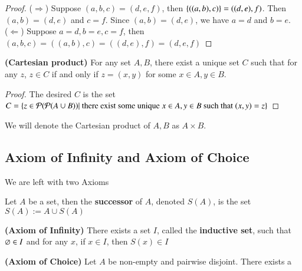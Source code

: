 \begin{proof}
    ($\Rightarrow$) Suppose $(a,b,c) = (d,e,f)$, then $\{((a,b),c)\} = ((d,e),f)$. Then $(a,b) = (d,e)$ and $c=f$. Since $(a,b) = (d,e)$, we have $a = d$ and $b=e$.\\
    ($\Leftarrow$) Suppose $a = d, b = e, c = f$, then $(a,b,c) = ((a,b) ,c) = ((d,e),f) = (d,e,f)$
\end{proof}
\begin{prop}
    {\textbf{(Cartesian product)} For any set $A,B$, there exist a unique set $C$ such that for any $z$, $z\in C$ if and only if $z= (x,y)$ for some $x\in A, y\in B$}.
\end{prop}
\begin{proof}
        The desired $C$ is the set $C =  \{z\in\mathcal P (\mathcal P(A\cup B))|\text{ there exist some unique }x\in A,y\in B\text{ such that }(x,y) = z\}$
\end{proof}
\begin{rem}
    We will denote the Cartesian product of $A,B$ as $A\times B$.
\end{rem}
\subsection{Axiom of Infinity and Axiom of Choice}
We are left with two Axioms 
\begin{defn}
    Let $A$ be a set, then the \textbf{successor} of $A$, denoted $S(A)$, is the set $S(A):=A\cup S(A)$
\end{defn}
\begin{ax}
    \textbf{(Axiom of Infinity)} There exists a set $I$, called the \textbf{inductive set}, such that $\varnothing\in I$ and for any $x$, if $x\in I$, then $S(x)\in I$
\end{ax}
\begin{ax}
    \textbf{(Axiom of Choice)} Let $A$ be non-empty and pairwise disjoint. There exists a 
\end{ax}
